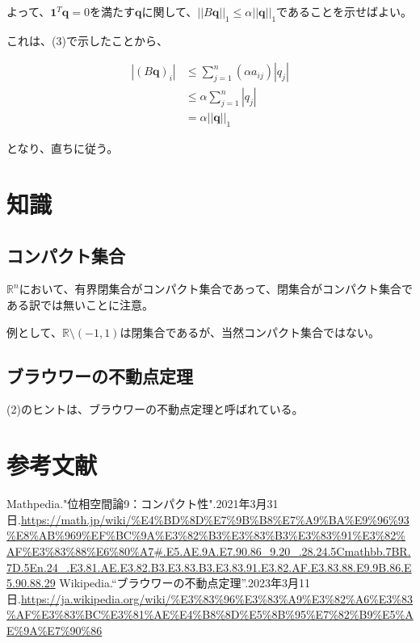 \documentclass[a4paper, 10pt, dvipdfmx]{jlreq}
\begin{document}
よって、$\bm{1}^T\bm{q}=0$を満たす$\bm{q}$に関して、$||B\bm{q}||_1\leq \alpha||\bm{q}||_1$であることを示せばよい。

これは、(3)で示したことから、

\begin{align*}
  |(B\bm{q})_i| & \leq \sum_{j=1}^n(\alpha a_{ij})|q_j| \\
                & \leq \alpha \sum_{j=1}^n |q_j|        \\
                & =\alpha ||\bm{q}||_1
\end{align*}

となり、直ちに従う。

\section{知識}

\subsection{コンパクト集合}

$\mathbb{R}^n$において、有界閉集合がコンパクト集合であって、閉集合がコンパクト集合である訳では無いことに注意。

例として、$\mathbb{R} \setminus (-1,1)$は閉集合であるが、当然コンパクト集合ではない。

\subsection{ブラウワーの不動点定理}

(2)のヒントは、ブラウワーの不動点定理と呼ばれている。

\section{参考文献}
\begin{thebibliography}{9}
  Mathpedia."位相空間論9：コンパクト性".2021年3月31日.\url{https://math.jp/wiki/%E4%BD%8D%E7%9B%B8%E7%A9%BA%E9%96%93%E8%AB%969%EF%BC%9A%E3%82%B3%E3%83%B3%E3%83%91%E3%82%AF%E3%83%88%E6%80%A7#.E5.AE.9A.E7.90.86_9.20_.28.24.5Cmathbb.7BR.7D.5En.24_.E3.81.AE.E3.82.B3.E3.83.B3.E3.83.91.E3.82.AF.E3.83.88.E9.9B.86.E5.90.88.29}
  Wikipedia.“ブラウワーの不動点定理”.2023年3月11日.\url{https://ja.wikipedia.org/wiki/%E3%83%96%E3%83%A9%E3%82%A6%E3%83%AF%E3%83%BC%E3%81%AE%E4%B8%8D%E5%8B%95%E7%82%B9%E5%AE%9A%E7%90%86}
\end{thebibliography}
\end{document}
